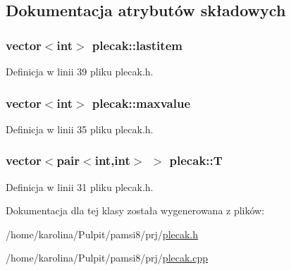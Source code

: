 \subsection{Dokumentacja atrybutów składowych}
\hypertarget{classplecak_a347d5be822af6095956944e815df0473}{
\subsubsection[{lastitem}]{\setlength{\rightskip}{0pt plus 5cm}vector$<$int$>$ plecak\-::lastitem}}\label{classplecak_a347d5be822af6095956944e815df0473}


Definicja w linii 39 pliku plecak.\-h.

\hypertarget{classplecak_a42a413a1022b907eaf87605b17c86738}{
\subsubsection[{maxvalue}]{\setlength{\rightskip}{0pt plus 5cm}vector$<$int$>$ plecak\-::maxvalue}}\label{classplecak_a42a413a1022b907eaf87605b17c86738}


Definicja w linii 35 pliku plecak.\-h.

\hypertarget{classplecak_aa4925fd62ae61e120cae3409d97a12bb}{
\subsubsection[{T}]{\setlength{\rightskip}{0pt plus 5cm}vector$<$pair$<$int,int$>$ $>$ plecak\-::\-T}}\label{classplecak_aa4925fd62ae61e120cae3409d97a12bb}


Definicja w linii 31 pliku plecak.\-h.



Dokumentacja dla tej klasy została wygenerowana z plików\-:\begin{DoxyCompactItemize}
\item 
/home/karolina/\-Pulpit/pamsi8/prj/\hyperlink{plecak_8h}{plecak.\-h}\item 
/home/karolina/\-Pulpit/pamsi8/prj/\hyperlink{plecak_8cpp}{plecak.\-cpp}\end{DoxyCompactItemize}
